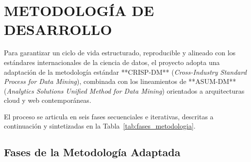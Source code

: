 \section{METODOLOGÍA DE DESARROLLO}

Para garantizar un ciclo de vida estructurado, reproducible y alineado con los estándares internacionales de la ciencia de datos, el proyecto adopta una adaptación de la metodología estándar **CRISP-DM** (\textit{Cross-Industry Standard Process for Data Mining}), combinada con los lineamientos de **ASUM-DM** (\textit{Analytics Solutions Unified Method for Data Mining}) orientados a arquitecturas cloud y web contemporáneas. 

El proceso se articula en seis fases secuenciales e iterativas, descritas a continuación y sintetizadas en la Tabla~\ref{tab:fases_metodologia}.

\subsection{Fases de la Metodología Adaptada}

